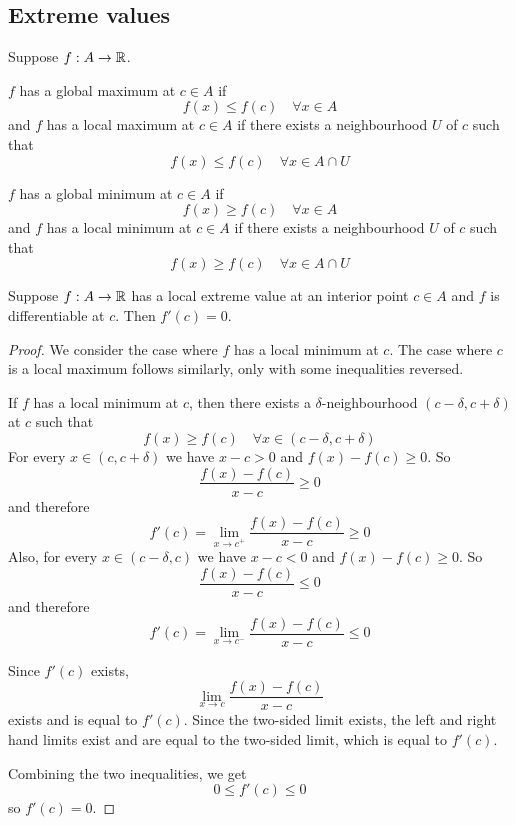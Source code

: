 \subsection{Extreme values}
Suppose $f: A \to \mathbb{R}$.
\begin{definition}
  $f$ has a global maximum at $c \in A$ if
  \[
    f(x) \leq f(c) \quad \forall x \in A
  \]
  and $f$ has a local maximum at $c \in A$ if there exists a neighbourhood $U$ of $c$ such that
  \[
    f(x) \leq f(c) \quad \forall x \in A \cap U
  \]
\end{definition}
\begin{definition}
  $f$ has a global minimum at $c \in A$ if
  \[
    f(x) \geq f(c) \quad \forall x \in A
  \]
  and $f$ has a local minimum at $c \in A$ if there exists a neighbourhood $U$ of $c$ such that
  \[
    f(x) \geq f(c) \quad \forall x \in A \cap U
  \]
\end{definition}
\begin{theorem}
  \label{thm:fermat}
  Suppose $f: A \to \mathbb{R}$ has a local extreme value at an interior point $c \in A$ and $f$ is differentiable at $c$. Then $f'(c) = 0$.
\end{theorem}
\begin{proof}
  We consider the case where $f$ has a local minimum at $c$. The case where $c$ is a local maximum follows similarly, only with some inequalities reversed.

  If $f$ has a local minimum at $c$, then there exists a $\delta$-neighbourhood $(c - \delta, c + \delta)$ at $c$ such that
  \[
    f(x) \geq f(c) \quad \forall x \in (c - \delta, c + \delta)
  \]
  For every $x \in (c, c + \delta)$ we have $x - c > 0$ and $f(x) - f(c) \geq 0$. So
  \[
    \frac{f(x) - f(c)}{x - c} \geq 0
  \]
  and therefore
  \[
    f'(c) = \lim_{x \to c ^ +} \frac{f(x) - f(c)}{x - c} \geq 0
  \]
  Also, for every $x \in (c - \delta, c)$ we have $x - c < 0$ and $f(x) - f(c) \geq 0$. So
  \[
    \frac{f(x) - f(c)}{x - c} \leq 0
  \]
  and therefore
  \[
    f'(c) = \lim_{x \to c ^ -} \frac{f(x) - f(c)}{x - c} \leq 0
  \]
  \begin{remark}
    Since $f'(c)$ exists, 
    \[
      \lim_{x \to c} \frac{f(x) - f(c)}{x - c}
    \]
    exists and is equal to $f'(c)$. Since the two-sided limit exists, the left and right hand limits exist and are equal to the two-sided limit, which is equal to $f'(c)$.
  \end{remark}
  Combining the two inequalities, we get 
  \[
    0 \leq f'(c) \leq 0
  \]
  so $f'(c) = 0$.
\end{proof}

